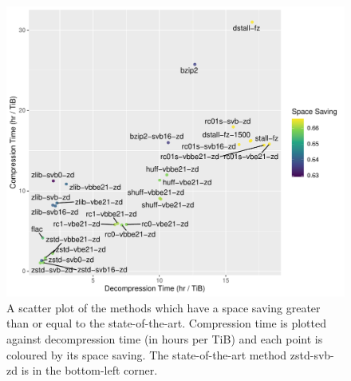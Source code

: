\begin{figure}
\centering
\includegraphics[scale=0.7]{plots/reads.blow5.test.ct-dt.pdf}
	\caption{\label{fig:results-ct-dt}A scatter plot of the methods which
	have a space saving greater than or equal to the state-of-the-art.
	Compression time is plotted against decompression time (in hours per
	TiB) and each point is coloured by its space saving. The
	state-of-the-art method zstd-svb-zd is in the bottom-left corner.}
\end{figure}
